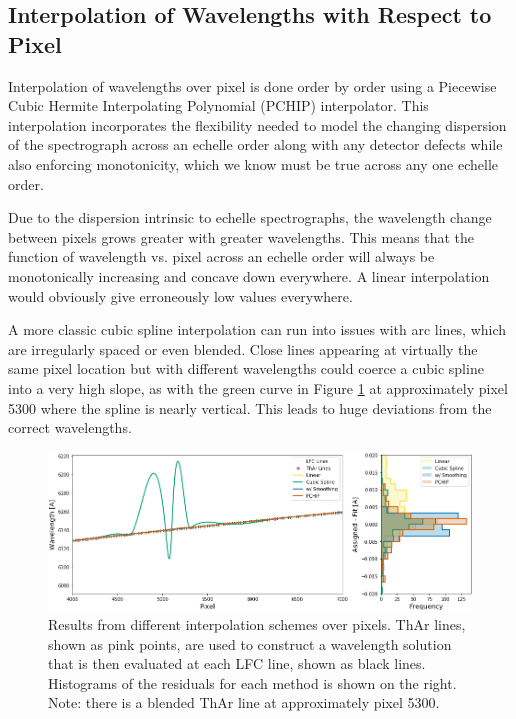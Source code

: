 \documentclass[modern]{aastex63}
\begin{document}
\subsection{Interpolation of Wavelengths with Respect to Pixel}
\label{sec:choice_wvp}
Interpolation of wavelengths over pixel  is done order by order using a Piecewise Cubic Hermite Interpolating Polynomial (PCHIP) interpolator.  This interpolation incorporates the flexibility needed to model the changing dispersion of the spectrograph across an echelle order along with any detector defects while also enforcing monotonicity, which we know must be true across any one echelle order.

Due to the dispersion intrinsic to echelle spectrographs, the wavelength change between pixels grows greater with greater wavelengths.  This means that the function of wavelength vs. pixel across an echelle order will always be monotonically increasing and concave down everywhere.  A linear interpolation would obviously give erroneously low values everywhere.

A more classic cubic spline interpolation can run into issues with arc lines, which are irregularly spaced or even blended.  Close lines appearing at virtually the same pixel location but with different wavelengths could coerce a cubic spline into a very high slope, as with the green curve in Figure \ref{fig:xinterp} at approximately pixel 5300 where the spline is nearly vertical.  This leads to huge deviations from the correct wavelengths.

\begin{figure}[h]
\centering
\includegraphics[width=\textwidth]{Figures/intpx_tests.png}
\caption{Results from different interpolation schemes over pixels.  ThAr lines, shown as pink points, are used to construct a wavelength solution that is then evaluated at each LFC line, shown as black lines.  Histograms of the residuals for each method is shown on the right.  Note: there is a blended ThAr line at approximately pixel 5300.}
\label{fig:xinterp}
\end{figure} 
\end{document}
